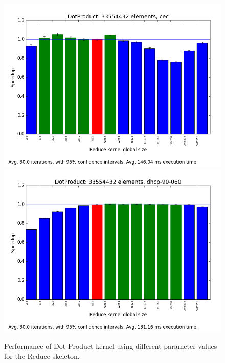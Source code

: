 \begin{figure}[h]
\includegraphics[width=\textwidth]{../../benchmarks/results/e3/DotProduct-33554432-cec.png}
\includegraphics[width=\textwidth]{../../benchmarks/results/e3/DotProduct-33554432-dhcp-90-060.png}
\caption{Performance of Dot Product kernel using different parameter
  values for the Reduce skeleton.} %
\end{figure}

